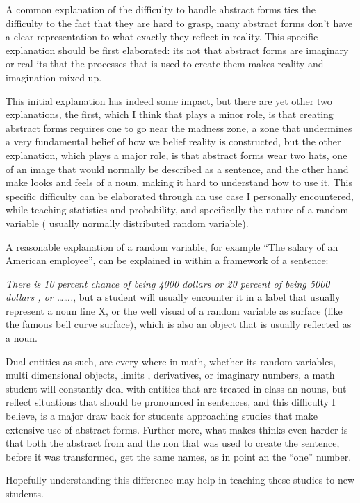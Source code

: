 \documentclass[10pt]{article}
\begin{document}
A common explanation of the difficulty to handle abstract forms ties the difficulty to the fact that they are hard to grasp, many abstract forms don’t have a clear representation to what exactly they reflect in reality. This specific explanation should be first elaborated: its not that abstract forms are imaginary or real its that the processes that is used to create them makes reality and imagination mixed up.\par
This initial explanation has indeed some impact, but there are yet other two explanations, the first, which I think that plays a minor role, is that creating abstract forms requires one to go near the madness zone, a zone that undermines a very fundamental belief of how we belief reality is constructed, but the other explanation, which plays a major role, is that abstract forms wear two hats, one of an image that would normally be described as a sentence, and the other hand make looks and feels of a noun, making it hard to understand how to use it.
This specific difficulty can be elaborated through an use case I personally encountered, while teaching statistics and probability, and specifically the nature of a random variable ( usually normally distributed random variable).\par
A reasonable explanation of a random variable, for example “The salary of an American employee”, can be explained in within a framework of a sentence:\par
\textit{There is 10 percent chance of being 4000 dollars or 20 percent of being 5000 dollars , or …….}, but a student will usually encounter it in a label that usually represent a noun line X, or the well visual of a random variable as surface (like the famous bell curve surface), which  is also an object that is usually reflected as a noun.\par
Dual entities as such, are every where in math, whether its random variables, multi dimensional objects, limits , derivatives, or imaginary numbers, a math student will constantly deal with entities that are treated in class an nouns, but reflect situations that should be pronounced in sentences, and this difficulty I believe, is a major draw back for students approaching studies that make extensive use of abstract forms. Further more, what makes thinks even harder is that both the abstract from and the non that was used to create the sentence, before it was transformed, get the same names, as in point an the “one” number.\par
Hopefully understanding this difference may help in teaching these studies to new students.\par
\end{document}
